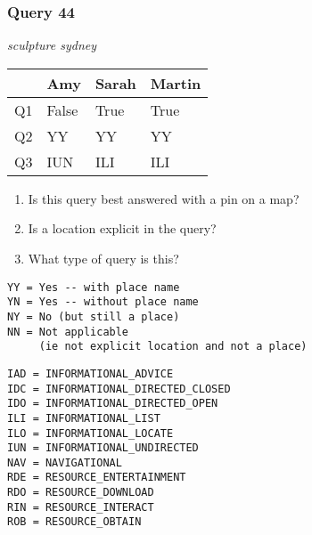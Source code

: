 \begin{frame}[fragile]
\frametitle{Query 44}
\vspace{1em}

\emph{sculpture sydney}

\vfill

\begin{table}
  \centering
  \begin{tabular}{ l l l l }
    & \textbf{Amy} & \textbf{Sarah} & \textbf{Martin}\\
    \toprule
    Q1 & False & True & True\\
Q2 & YY & YY & YY\\
Q3 & IUN & ILI & ILI\\
    \bottomrule
  \end{tabular}
\end{table}

\vfill

\tiny{

\begin{enumerate}
\item Is this query best answered with a pin on a map?
\item Is a location explicit in the query?
\item What type of query is this?
\end{enumerate}

\vfill

\begin{multicols}{2}
\begin{verbatim}
YY = Yes -- with place name
YN = Yes -- without place name
NY = No (but still a place)
NN = Not applicable 
     (ie not explicit location and not a place)
\end{verbatim}

\columnbreak
\begin{verbatim}
IAD = INFORMATIONAL_ADVICE
IDC = INFORMATIONAL_DIRECTED_CLOSED
IDO = INFORMATIONAL_DIRECTED_OPEN
ILI = INFORMATIONAL_LIST
ILO = INFORMATIONAL_LOCATE
IUN = INFORMATIONAL_UNDIRECTED
NAV = NAVIGATIONAL
RDE = RESOURCE_ENTERTAINMENT
RDO = RESOURCE_DOWNLOAD
RIN = RESOURCE_INTERACT
ROB = RESOURCE_OBTAIN
\end{verbatim}
\end{multicols}
}

\end{frame}


